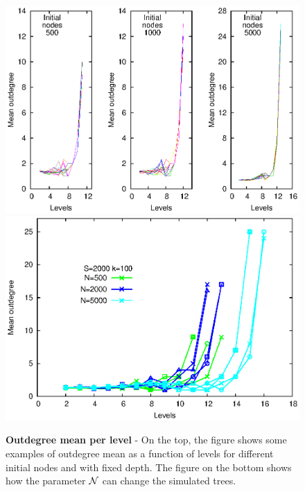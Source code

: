 \begin{figure}[p]%
\includegraphics[width=\textwidth,draft=false]{grafici/ToutVSlev.eps}
\includegraphics[width=\textwidth,draft=false]{grafici/VoutVSlev3.eps}
\caption{\label{Koutlev} \footnotesize\textbf{Outdegree mean per level} - On the top, the figure shows some examples of outdegree mean as a function of levels for different initial nodes and with fixed depth. The figure on the bottom shows how the parameter $\mathcal N$ can change the simulated trees.}
\end{figure}


